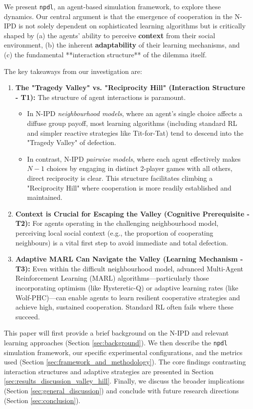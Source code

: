 \documentclass[]{llncs} %
\begin{document}
We present \texttt{npdl}, an agent-based simulation framework, to explore these dynamics. Our central argument is that the emergence of cooperation in the N-IPD is not solely dependent on sophisticated learning algorithms but is critically shaped by (a) the agents' ability to perceive \textbf{context} from their social environment, (b) the inherent \textbf{adaptability} of their learning mechanisms, and (c) the fundamental **interaction structure** of the dilemma itself.

The key takeaways from our investigation are:
\begin{enumerate}
    \item \textbf{The "Tragedy Valley" vs. "Reciprocity Hill" (Interaction Structure - T1):} The structure of agent interactions is paramount.
        \begin{itemize}
            \item In N-IPD \textit{neighbourhood models}, where an agent's single choice affects a diffuse group payoff, most learning algorithms (including standard RL and simpler reactive strategies like Tit-for-Tat) tend to descend into the "Tragedy Valley" of defection.
            \item In contrast, N-IPD \textit{pairwise models}, where each agent effectively makes $N-1$ choices by engaging in distinct 2-player games with all others, direct reciprocity is clear. This structure facilitates climbing a "Reciprocity Hill" where cooperation is more readily established and maintained.
        \end{itemize}
    \item \textbf{Context is Crucial for Escaping the Valley (Cognitive Prerequisite - T2):} For agents operating in the challenging neighbourhood model, perceiving local social context (e.g., the proportion of cooperating neighbours) is a vital first step to avoid immediate and total defection.
    \item \textbf{Adaptive MARL Can Navigate the Valley (Learning Mechanism - T3):} Even within the difficult neighbourhood model, advanced Multi-Agent Reinforcement Learning (MARL) algorithms—particularly those incorporating optimism (like Hysteretic-Q) or adaptive learning rates (like Wolf-PHC)—can enable agents to learn resilient cooperative strategies and achieve high, sustained cooperation. Standard RL often fails where these succeed.
\end{enumerate}

This paper will first provide a brief background on the N-IPD and relevant learning approaches (Section \ref{sec:background}). We then describe the \texttt{npdl} simulation framework, our specific experimental configurations, and the metrics used (Section \ref{sec:framework_and_methodology}). The core findings contrasting interaction structures and adaptive strategies are presented in Section \ref{sec:results_discussion_valley_hill}. Finally, we discuss the broader implications (Section \ref{sec:general_discussion}) and conclude with future research directions (Section \ref{sec:conclusion}).
\end{document}
